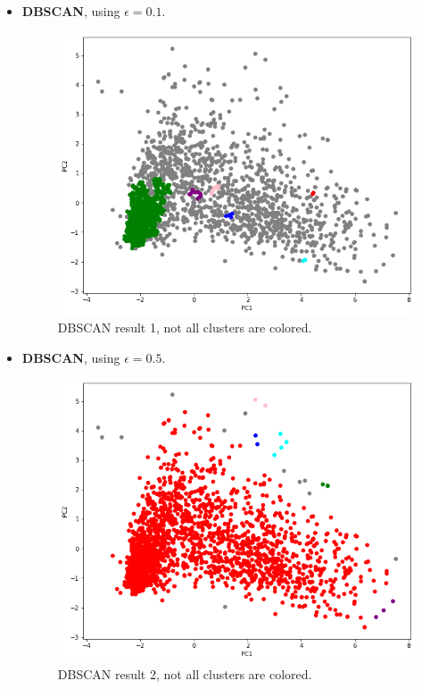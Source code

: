 \documentclass[11pt]{article}
\begin{document}
\begin{itemize}
\newpage

\item \textbf{DBSCAN}, using $\epsilon=0.1$.

\begin{figure}[h!]
\centerline{\includegraphics[scale=0.5]{clu_10.png}}
\caption{DBSCAN result 1, not all clusters are colored.}
\end{figure}

\item \textbf{DBSCAN}, using $\epsilon=0.5$.

\begin{figure}[h!]
\centerline{\includegraphics[scale=0.5]{clu_11.png}}
\caption{DBSCAN result 2, not all clusters are colored.}
\end{figure}

\end{itemize}
\end{document}
